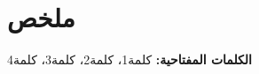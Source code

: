 
\chapter*{\texorpdfstring{\hfill\textarabic{ملخص}}{Abstract}}

\textarabic{
	\lipsum[1]
}

\vspace{0.5cm}
\noindent\textarabic{\textbf{الكلمات المفتاحية: }} \textarabic{كلمة1، كلمة2، كلمة3، كلمة4}
